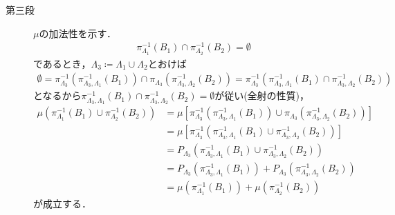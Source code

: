 \begin{prf}
\begin{description}
			\item[第三段]
				$\mu$の加法性を示す．
				\begin{align}
					\pi_{\Lambda_1}^{-1}(B_1) \cap \pi_{\Lambda_2}^{-1}(B_2) = \emptyset
				\end{align}
				であるとき，$\Lambda_3 \coloneqq \Lambda_1 \cup \Lambda_2$とおけば
				\begin{align}
					\emptyset 
					= \pi_{\Lambda_3}^{-1}\left( \pi_{\Lambda_3,\Lambda_1}^{-1}(B_1) \right)
					\cap \pi_{\Lambda_3}\left( \pi_{\Lambda_3,\Lambda_2}^{-1}(B_2) \right)
					= \pi_{\Lambda_3}^{-1}\left( \pi_{\Lambda_3,\Lambda_1}^{-1}(B_1) \cap \pi_{\Lambda_3,\Lambda_2}^{-1}(B_2) \right)
				\end{align}
				となるから$\pi_{\Lambda_3,\Lambda_1}^{-1}(B_1) \cap \pi_{\Lambda_3,\Lambda_2}^{-1}(B_2)
				= \emptyset$が従い(全射の性質)，
				\begin{align}
					\mu\left( \pi_{\Lambda_1}^{-1}(B_1) \cup \pi_{\Lambda_2}^{-1}(B_2) \right)
					&= \mu\left[\pi_{\Lambda_3}^{-1}\left( \pi_{\Lambda_3,\Lambda_1}^{-1}(B_1) \right)
					\cup \pi_{\Lambda_3}\left( \pi_{\Lambda_3,\Lambda_2}^{-1}(B_2) \right) \right] \\
					&= \mu\left[ \pi_{\Lambda_3}^{-1}\left( \pi_{\Lambda_3,\Lambda_1}^{-1}(B_1) \cup \pi_{\Lambda_3,\Lambda_2}^{-1}(B_2) \right) \right] \\
					&= P_{\Lambda_3} \left( \pi_{\Lambda_3,\Lambda_1}^{-1}(B_1) \cup \pi_{\Lambda_3,\Lambda_2}^{-1}(B_2) \right) \\
					&= P_{\Lambda_3} \left( \pi_{\Lambda_3,\Lambda_1}^{-1}(B_1) \right)
						+ P_{\Lambda_3} \left( \pi_{\Lambda_3,\Lambda_2}^{-1}(B_2) \right) \\
					&= \mu\left( \pi_{\Lambda_1}^{-1}(B_1) \right)
						+ \mu\left( \pi_{\Lambda_2}^{-1}(B_2) \right)
				\end{align}
				が成立する．
		\end{description}
	\end{prf}